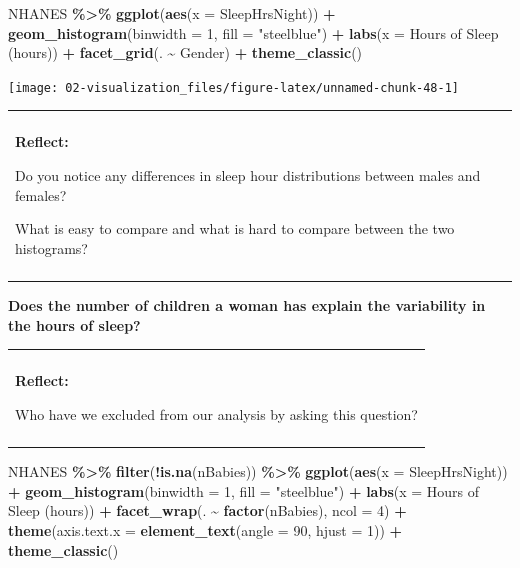 \documentclass[
]{book}
\newenvironment{Shaded}{\begin{snugshade}}{\end{snugshade}}
\newcommand{\AttributeTok}[1]{\textcolor[rgb]{0.13,0.29,0.53}{#1}}
\newcommand{\DecValTok}[1]{\textcolor[rgb]{0.00,0.00,0.81}{#1}}
\newcommand{\FunctionTok}[1]{\textcolor[rgb]{0.13,0.29,0.53}{\textbf{#1}}}
\newcommand{\NormalTok}[1]{#1}
\newcommand{\SpecialCharTok}[1]{\textcolor[rgb]{0.81,0.36,0.00}{\textbf{#1}}}
\newcommand{\StringTok}[1]{\textcolor[rgb]{0.31,0.60,0.02}{#1}}
\newenvironment{reflect}
{
    \begin{center}
    
    \begin{tabular}{|p{0.8\textwidth}|}
    \rowcolor{LightBlue}
    \hline\\
    \rowcolor{LightBlue}
    \textbf{Reflect:}
}
{
    \\\rowcolor{LightBlue}
    \\\hline
    \end{tabular} 
    \end{center}
}
\begin{document}
\begin{Shaded}
\begin{Highlighting}[]
\NormalTok{NHANES }\SpecialCharTok{\%\textgreater{}\%}
    \FunctionTok{ggplot}\NormalTok{(}\FunctionTok{aes}\NormalTok{(}\AttributeTok{x =}\NormalTok{ SleepHrsNight)) }\SpecialCharTok{+}
    \FunctionTok{geom\_histogram}\NormalTok{(}\AttributeTok{binwidth =} \DecValTok{1}\NormalTok{, }\AttributeTok{fill =} \StringTok{"steelblue"}\NormalTok{) }\SpecialCharTok{+} 
    \FunctionTok{labs}\NormalTok{(}\AttributeTok{x =} \StringTok{\textquotesingle{}Hours of Sleep (hours)\textquotesingle{}}\NormalTok{) }\SpecialCharTok{+} 
    \FunctionTok{facet\_grid}\NormalTok{(. }\SpecialCharTok{\textasciitilde{}}\NormalTok{ Gender) }\SpecialCharTok{+} 
    \FunctionTok{theme\_classic}\NormalTok{()}
\end{Highlighting}
\end{Shaded}

\begin{center}\texttt{[image: 02-visualization\_files/figure-latex/unnamed-chunk-48-1]} \end{center}

\begin{reflect}
Do you notice any differences in sleep hour distributions between males
and females?

What is easy to compare and what is hard to compare between the two
histograms?
\end{reflect}

\textbf{Does the number of children a woman has explain the variability in the hours of sleep?}

\begin{reflect}
Who have we excluded from our analysis by asking this question?
\end{reflect}

\begin{Shaded}
\begin{Highlighting}[]
\NormalTok{NHANES }\SpecialCharTok{\%\textgreater{}\%}
    \FunctionTok{filter}\NormalTok{(}\SpecialCharTok{!}\FunctionTok{is.na}\NormalTok{(nBabies)) }\SpecialCharTok{\%\textgreater{}\%} 
    \FunctionTok{ggplot}\NormalTok{(}\FunctionTok{aes}\NormalTok{(}\AttributeTok{x =}\NormalTok{ SleepHrsNight)) }\SpecialCharTok{+}
    \FunctionTok{geom\_histogram}\NormalTok{(}\AttributeTok{binwidth =} \DecValTok{1}\NormalTok{, }\AttributeTok{fill =} \StringTok{"steelblue"}\NormalTok{) }\SpecialCharTok{+} 
    \FunctionTok{labs}\NormalTok{(}\AttributeTok{x =} \StringTok{\textquotesingle{}Hours of Sleep (hours)\textquotesingle{}}\NormalTok{) }\SpecialCharTok{+} 
    \FunctionTok{facet\_wrap}\NormalTok{(. }\SpecialCharTok{\textasciitilde{}} \FunctionTok{factor}\NormalTok{(nBabies), }\AttributeTok{ncol =} \DecValTok{4}\NormalTok{) }\SpecialCharTok{+} 
    \FunctionTok{theme}\NormalTok{(}\AttributeTok{axis.text.x =} \FunctionTok{element\_text}\NormalTok{(}\AttributeTok{angle =} \DecValTok{90}\NormalTok{, }\AttributeTok{hjust =} \DecValTok{1}\NormalTok{)) }\SpecialCharTok{+}
    \FunctionTok{theme\_classic}\NormalTok{()}
\end{Highlighting}
\end{Shaded}
\end{document}
